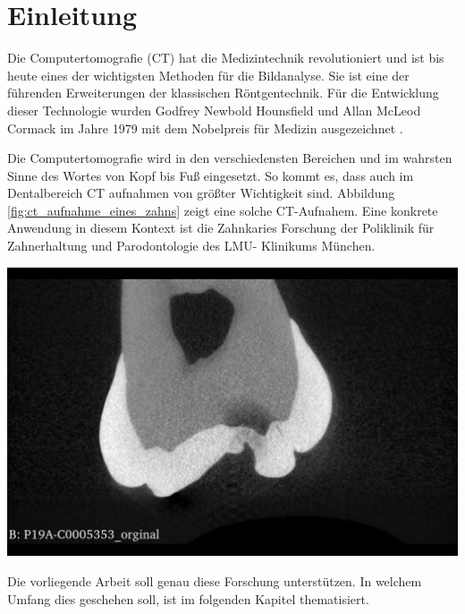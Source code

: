 \chapter{Einleitung}
\label{chap:einleitung} Die Computertomografie (CT) hat die Medizintechnik revolutioniert
und ist bis heute eines der wichtigsten Methoden für die Bildanalyse. Sie ist
eine der führenden Erweiterungen der klassischen Röntgentechnik. Für die Entwicklung
dieser Technologie wurden Godfrey Newbold Hounsfield und Allan McLeod Cormack im
Jahre 1979 mit dem Nobelpreis für Medizin ausgezeichnet \citep[Seite12]{handels2000}.

\begin{minipage}{0.40\textwidth}
	Die Computertomografie wird in den verschiedensten Bereichen und im wahrsten Sinne
	des Wortes von Kopf bis Fuß eingesetzt. So kommt es, dass auch im Dentalbereich
	CT aufnahmen von größter Wichtigkeit sind. Abbildung
	\ref{fig:ct_aufnahme_eines_zahns} zeigt eine solche CT-Aufnahem. Eine konkrete
	Anwendung in diesem Kontext ist die Zahnkaries Forschung der Poliklinik für Zahnerhaltung
	und Parodontologie des LMU- Klinikums München.
\end{minipage}
\hfill
\begin{minipage}{0.50\textwidth}
	\centering
	\includegraphics[scale=0.2, width=\textwidth]{img/micro_ct_orginal.jpg}
	\label{fig:ct_aufnahme_eines_zahns}
\end{minipage}

Die vorliegende Arbeit soll genau diese Forschung unterstützen. In welchem Umfang
dies geschehen soll, ist im folgenden Kapitel thematisiert.

